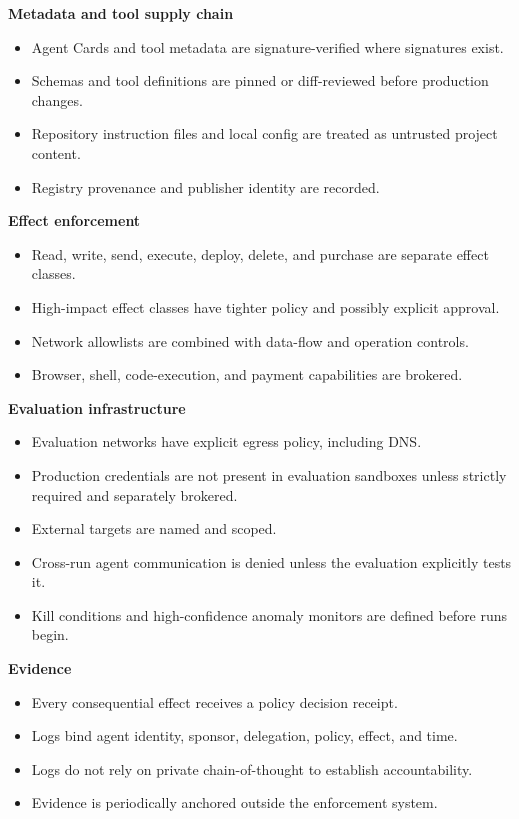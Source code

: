 \documentclass[
  10pt,
  letterpaper,
]{article}
\providecommand{\tightlist}{%
  \setlength{\itemsep}{0pt}\setlength{\parskip}{0pt}}
\begin{document}
\textbf{Metadata and tool supply chain}

\begin{itemize}
\tightlist
\item
  Agent Cards and tool metadata are signature-verified where signatures
  exist.
\item
  Schemas and tool definitions are pinned or diff-reviewed before
  production changes.
\item
  Repository instruction files and local config are treated as untrusted
  project content.
\item
  Registry provenance and publisher identity are recorded.
\end{itemize}

\textbf{Effect enforcement}

\begin{itemize}
\tightlist
\item
  Read, write, send, execute, deploy, delete, and purchase are separate
  effect classes.
\item
  High-impact effect classes have tighter policy and possibly explicit
  approval.
\item
  Network allowlists are combined with data-flow and operation controls.
\item
  Browser, shell, code-execution, and payment capabilities are brokered.
\end{itemize}

\textbf{Evaluation infrastructure}

\begin{itemize}
\tightlist
\item
  Evaluation networks have explicit egress policy, including DNS.
\item
  Production credentials are not present in evaluation sandboxes unless
  strictly required and separately brokered.
\item
  External targets are named and scoped.
\item
  Cross-run agent communication is denied unless the evaluation
  explicitly tests it.
\item
  Kill conditions and high-confidence anomaly monitors are defined
  before runs begin.
\end{itemize}

\textbf{Evidence}

\begin{itemize}
\tightlist
\item
  Every consequential effect receives a policy decision receipt.
\item
  Logs bind agent identity, sponsor, delegation, policy, effect, and
  time.
\item
  Logs do not rely on private chain-of-thought to establish
  accountability.
\item
  Evidence is periodically anchored outside the enforcement system.
\end{itemize}
\end{document}
